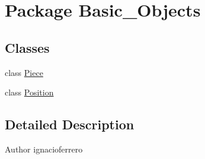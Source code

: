 \hypertarget{namespace_basic___objects}{\section{Package Basic\-\_\-\-Objects}
\label{namespace_basic___objects}
}
\subsection*{Classes}
\begin{DoxyCompactItemize}
\item 
class \hyperlink{class_basic___objects_1_1_piece}{Piece}
\item 
class \hyperlink{class_basic___objects_1_1_position}{Position}
\end{DoxyCompactItemize}


\subsection{Detailed Description}
\begin{DoxyAuthor}{Author}
ignacioferrero 
\end{DoxyAuthor}
